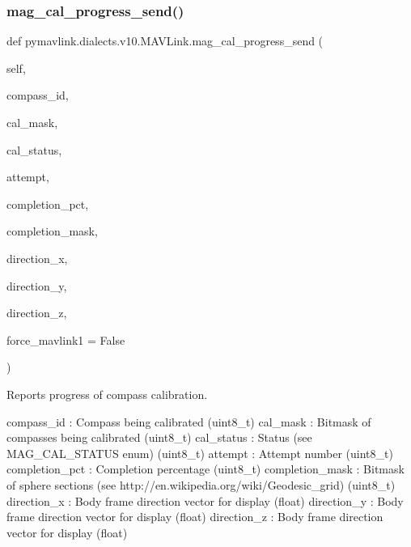 \begin{DoxyVerb}
\begin{DoxyVerb}
\begin{DoxyVerb}
\begin{DoxyVerb}
\subsubsection{\texorpdfstring{mag\+\_\+cal\+\_\+progress\+\_\+send()}{mag\_cal\_progress\_send()}}
{\footnotesize\ttfamily def pymavlink.\+dialects.\+v10.\+M\+A\+V\+Link.\+mag\+\_\+cal\+\_\+progress\+\_\+send (\begin{DoxyParamCaption}\item[{}]{self,  }\item[{}]{compass\+\_\+id,  }\item[{}]{cal\+\_\+mask,  }\item[{}]{cal\+\_\+status,  }\item[{}]{attempt,  }\item[{}]{completion\+\_\+pct,  }\item[{}]{completion\+\_\+mask,  }\item[{}]{direction\+\_\+x,  }\item[{}]{direction\+\_\+y,  }\item[{}]{direction\+\_\+z,  }\item[{}]{force\+\_\+mavlink1 = {\ttfamily False} }\end{DoxyParamCaption})}

\begin{DoxyVerb}Reports progress of compass calibration.

compass_id                : Compass being calibrated (uint8_t)
cal_mask                  : Bitmask of compasses being calibrated (uint8_t)
cal_status                : Status (see MAG_CAL_STATUS enum) (uint8_t)
attempt                   : Attempt number (uint8_t)
completion_pct            : Completion percentage (uint8_t)
completion_mask           : Bitmask of sphere sections (see http://en.wikipedia.org/wiki/Geodesic_grid) (uint8_t)
direction_x               : Body frame direction vector for display (float)
direction_y               : Body frame direction vector for display (float)
direction_z               : Body frame direction vector for display (float)\end{DoxyVerb}
 \mbox{\label{classpymavlink_1_1dialects_1_1v10_1_1MAVLink_a12ea162841832df32f386c4e1ff8fc4f}} 

\end{DoxyVerb}
\end{DoxyVerb}
\end{DoxyVerb}
\end{DoxyVerb}

